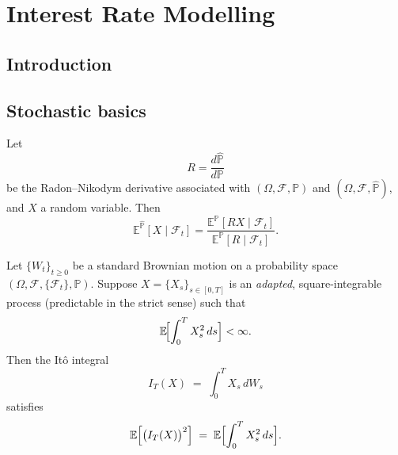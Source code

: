 \chapter{Interest Rate Modelling}
\section{Introduction}
\section{Stochastic basics}

\begin{theorem}
Let 
\[
R = \frac{d\mathbb{\hat{P}}}{d\mathbb{P}}
\]
be the Radon–Nikodym derivative associated with 
\((\Omega, \mathcal{F}, \mathbb{P})\) and \((\Omega, \mathcal{F}, \mathbb{\hat{P}})\),
and \(X\) a random variable. Then
\[
\mathbb{E}^{\mathbb{\hat{P}}}[X \mid \mathcal{F}_t] = 
\frac{\mathbb{E}^{\mathbb{P}}[R X \mid \mathcal{F}_t]}{\mathbb{E}^{\mathbb{P}}[R \mid \mathcal{F}_t]}.
\]
\end{theorem}

\begin{theorem}[It\^o's Isometry]
\label{thm:ito-isometry}
Let $\{W_t\}_{t \ge 0}$ be a standard Brownian motion on a probability space 
$(\Omega, \mathcal{F}, \{\mathcal{F}_t\}, \mathbb{P})$. 
Suppose $X = \{X_s\}_{s \in [0,T]}$ is an \emph{adapted}, 
square-integrable process (predictable in the strict sense) such that
\[
   \mathbb{E}\!\Bigl[\int_0^T X_s^2 \, ds\Bigr] < \infty.
\]
Then the It\^o integral
\[
   I_T(X) \;=\; \int_0^T X_s \, dW_s
\]
satisfies
\[
   \mathbb{E}\Bigl[\bigl(I_T(X)\bigr)^2\Bigr]
   \;=\;
   \mathbb{E}\Bigl[\int_0^T X_s^2 \, ds\Bigr].
\]
\end{theorem}

